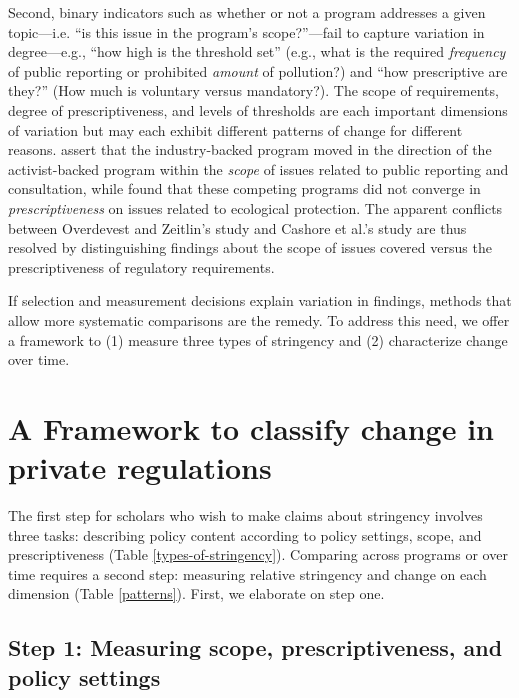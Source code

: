 \documentclass[
      12pt,
            Review ]{article}
\begin{document}
Second, binary indicators such as whether or not a program addresses a given topic---i.e. ``is this issue in the program's scope?''---fail to capture variation in degree---e.g., ``how high is the threshold set'' (e.g., what is the required \emph{frequency} of public reporting or prohibited \emph{amount} of pollution?) and ``how prescriptive are they?'' (How much is voluntary versus mandatory?). The scope of requirements, degree of prescriptiveness, and levels of thresholds are each important dimensions of variation but may each exhibit different patterns of change for different reasons. \citet{Overdevest2014} assert that the industry-backed program moved in the direction of the activist-backed program within the \emph{scope} of issues related to public reporting and consultation, while \citet{Cashore2004} found that these competing programs did not converge in \emph{prescriptiveness} on issues related to ecological protection. The apparent conflicts between Overdevest and Zeitlin's study and Cashore et al.'s study are thus resolved by distinguishing findings about the scope of issues covered versus the prescriptiveness of regulatory requirements.

If selection and measurement decisions explain variation in findings, methods that allow more systematic comparisons are the remedy. To address this need, we offer a framework to (1) measure three types of stringency and (2) characterize change over time.

\hypertarget{a-framework-to-classify-change-in-private-regulations}{%
\section{A Framework to classify change in private regulations}\label{a-framework-to-classify-change-in-private-regulations}}

The first step for scholars who wish to make claims about stringency involves three tasks: describing policy content according to policy settings, scope, and prescriptiveness (Table \ref{types-of-stringency}). Comparing across programs or over time requires a second step: measuring relative stringency and change on each dimension (Table \ref{patterns}). First, we elaborate on step one.

\hypertarget{step-1-measuring-scope-prescriptiveness-and-policy-settings}{%
\subsection{Step 1: Measuring scope, prescriptiveness, and policy settings}\label{step-1-measuring-scope-prescriptiveness-and-policy-settings}}
\end{document}
